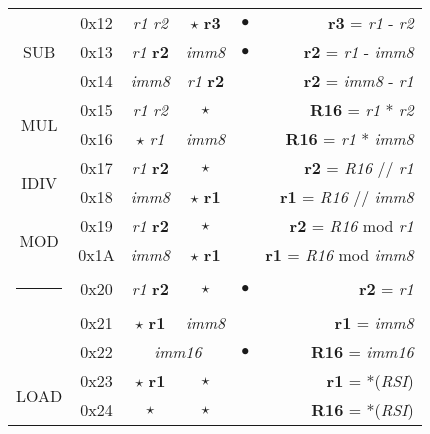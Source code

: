 \documentclass[a4paper,12pt]{article}
\makeatletter
\newcommand{\thickhline}{%
    \noalign {\ifnum 0=`}\fi \hrule height 2pt
    \futurelet \reserved@a \@xhline
}
\makeatother
\begin{document}
\begin{table}[H]
\begin{tabular}{|c|c|c|c|c|r|}
        \hline
        \multirow{3}{*}{SUB} & 0x12 & \textit{r1} \quad \textit{r2}  & $\star$ \quad \textbf{r3} & $\bullet$ & \textbf{r3} = \textit{r1} - \textit{r2}\\
        \cline{2-6}
                             & 0x13 & \textit{r1} \quad \textbf{r2}  & \textit{imm8} & $\bullet$ & \textbf{r2} = \textit{r1} - \textit{imm8}\\
        \cline{2-6}
                             & 0x14 & \textit{imm8} &  \textit{r1} \quad \textbf{r2} & & \textbf{r2} = \textit{imm8} - \textit{r1}\\
        \hline
        \multirow{2}{*}{MUL} & 0x15 & \textit{r1} \quad \textit{r2}  & $\star$ & & \textbf{R16} = \textit{r1} * \textit{r2}\\
        \cline{2-6}
                             & 0x16 & $\star$ \quad \textit{r1}  & \textit{imm8} & & \textbf{R16} = \textit{r1} * \textit{imm8}\\
        \hline
        \multirow{2}{*}{IDIV}& 0x17 & \textit{r1} \quad \textbf{r2}  & $\star$ & & \textbf{r2} = \textit{R16} // \textit{r1}\\
        \cline{2-6}
                             & 0x18 & \textit{imm8} & $\star$ \quad \textbf{r1} & & \textbf{r1} = \textit{R16} // \textit{imm8}\\
        \hline
        \multirow{2}{*}{MOD} & 0x19 & \textit{r1} \quad \textbf{r2}  & $\star$ & & \textbf{r2} = \textit{R16} mod \textit{r1}\\
        \cline{2-6}
                             & 0x1A & \textit{imm8} & $\star$ \quad \textbf{r1} & & \textbf{r1} = \textit{R16} mod \textit{imm8}\\
        \thickhline
        \multirow{3}{*}{MOV} & 0x20 & \textit{r1} \quad \textbf{r2} & $\star$ & $\bullet$ & \textbf{r2} = \textit{r1}\\
        \cline{2-6}
                             & 0x21 & $\star$ \quad \textbf{r1} & \textit{imm8} & & \textbf{r1} = \textit{imm8}\\
        \cline{2-6}
                             & 0x22 & \multicolumn{2}{c|}{\textit{imm16}} & $\bullet$ & \textbf{R16} = \textit{imm16} \\
        \hline
        \multirow{2}{*}{LOAD} & 0x23 & $\star$ \quad \textbf{r1} & $\star$ & & \textbf{r1} = *(\textit{RSI})\\
        \cline{2-6}
                             & 0x24 & $\star$ & $\star$ & & \textbf{R16} = *(\textit{RSI})\\

\end{tabular}
\end{table}
\end{document}
